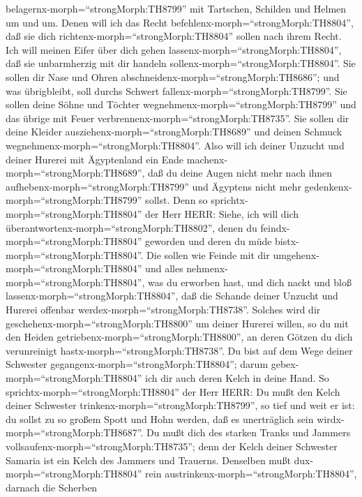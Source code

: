 belagernx-morph=``strongMorph:TH8799'' mit Tartschen, Schilden und
Helmen um und um. Denen will ich das Recht
befehlenx-morph=``strongMorph:TH8804'', daß sie dich
richtenx-morph=``strongMorph:TH8804'' sollen nach ihrem Recht.
 Ich will meinen Eifer über dich gehen
lassenx-morph=``strongMorph:TH8804'', daß sie unbarmherzig mit dir
handeln sollenx-morph=``strongMorph:TH8804''. Sie sollen dir Nase und
Ohren abschneidenx-morph=``strongMorph:TH8686''; und was übrigbleibt,
soll durchs Schwert fallenx-morph=``strongMorph:TH8799''. Sie sollen
deine Söhne und Töchter wegnehmenx-morph=``strongMorph:TH8799'' und das
übrige mit Feuer verbrennenx-morph=``strongMorph:TH8735''. 
Sie sollen dir deine Kleider ausziehenx-morph=``strongMorph:TH8689'' und
deinen Schmuck wegnehmenx-morph=``strongMorph:TH8804''. 
Also will ich deiner Unzucht und deiner Hurerei mit Ägyptenland ein Ende
machenx-morph=``strongMorph:TH8689'', daß du deine Augen nicht mehr nach
ihnen aufhebenx-morph=``strongMorph:TH8799'' und Ägyptens nicht mehr
gedenkenx-morph=``strongMorph:TH8799'' sollst.  Denn so
sprichtx-morph=``strongMorph:TH8804'' der Herr HERR: Siehe, ich will
dich überantwortenx-morph=``strongMorph:TH8802'', denen du
feindx-morph=``strongMorph:TH8804'' geworden und deren du müde
bistx-morph=``strongMorph:TH8804''.  Die sollen wie Feinde
mit dir umgehenx-morph=``strongMorph:TH8804'' und alles
nehmenx-morph=``strongMorph:TH8804'', was du erworben hast, und dich
nackt und bloß lassenx-morph=``strongMorph:TH8804'', daß die Schande
deiner Unzucht und Hurerei offenbar werdex-morph=``strongMorph:TH8738''.
 Solches wird dir geschehenx-morph=``strongMorph:TH8800''
um deiner Hurerei willen, so du mit den Heiden
getriebenx-morph=``strongMorph:TH8800'', an deren Götzen du dich
verunreinigt hastx-morph=``strongMorph:TH8738''.  Du bist
auf dem Wege deiner Schwester gegangenx-morph=``strongMorph:TH8804'';
darum gebex-morph=``strongMorph:TH8804'' ich dir auch deren Kelch in
deine Hand.  So sprichtx-morph=``strongMorph:TH8804'' der
Herr HERR: Du mußt den Kelch deiner Schwester
trinkenx-morph=``strongMorph:TH8799'', so tief und weit er ist: du
sollst zu so großem Spott und Hohn werden, daß es unerträglich sein
wirdx-morph=``strongMorph:TH8687''.  Du mußt dich des
starken Tranks und Jammers vollsaufenx-morph=``strongMorph:TH8735'';
denn der Kelch deiner Schwester Samaria ist ein Kelch des Jammers und
Trauerns.  Denselben mußt dux-morph=``strongMorph:TH8804''
rein austrinkenx-morph=``strongMorph:TH8804'', darnach die Scherben
